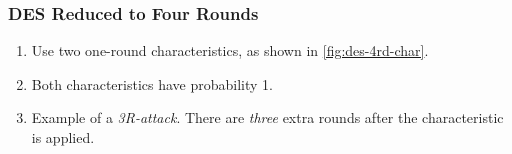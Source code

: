 \documentclass{beamer}
\begin{document}
	\begin{frame}
		\frametitle{DES Reduced to Four Rounds}
		\begin{enumerate}
			\item<1-> Use two one-round characteristics, as shown in
			\cref{fig:des-4rd-char}.
			\item<2-> Both characteristics have probability 1.
			\item<3-> Example of a \emph{3R-attack}. There are \emph{three}
			extra rounds after the characteristic is applied.
		\end{enumerate}
		
	\end{frame}
\end{document}
